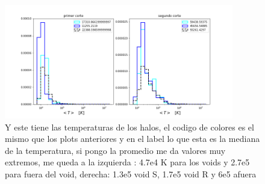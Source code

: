 \begin{figure}[h]
\centering
\includegraphics[width=10cm]{Figures/temperatura_cortemasa.png}
\decoRule
\caption[asd]{Y este tiene las temperaturas de los halos, el codigo de colores es el mismo que los plots anteriores y en el label lo que esta es la mediana de la temperatura, si pongo la promedio me da valores muy extremos, me queda a la izquierda : 4.7e4 K para los voids y 2.7e5 para fuera del void, derecha: 1.3e5 void S, 1.7e5 void R y 6e5 afuera}
\label{fig:Electron}
\end{figure}